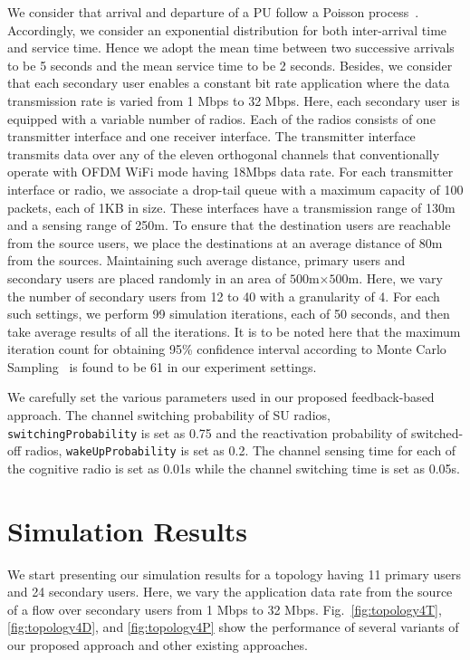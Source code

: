 We consider that arrival and departure of a PU follow a Poisson process~\cite{heo2008mathematical}. Accordingly, we consider an exponential distribution for both inter-arrival time and service time. Hence we adopt the mean time between two successive arrivals to be 5 seconds and the mean service time to be 2 seconds. Besides, we consider that each secondary user enables a constant bit rate application where the data transmission rate is varied from 1 Mbps to 32 Mbps. Here, each secondary user is equipped with a variable number of radios. Each of the radios consists of one transmitter interface and one receiver interface. The transmitter interface transmits data over any of the eleven orthogonal channels that conventionally operate with OFDM WiFi mode having 18Mbps data rate. For each transmitter interface or radio, we associate a drop-tail queue with a maximum capacity of 100 packets, each of 1KB in size. These interfaces have a transmission range of 130m and a sensing range of 250m. To ensure that the destination users are reachable from the source users, we place the destinations at an average distance of 80m from the sources. Maintaining such average distance, primary users and secondary users are placed randomly in an area of $500$m$\times 500$m. Here, we vary the number of secondary users from 12 to 40 with a granularity of 4. For each such settings, we perform 99 simulation iterations, each of 50 seconds, and then take average results of all the iterations. It is to be noted here that the maximum iteration count for obtaining 95\% confidence interval according to Monte Carlo Sampling~\cite{winston2000simulation} is found to be 61 in our experiment settings. 

We carefully set the various parameters used in our proposed feedback-based approach. The channel switching probability of SU radios, \texttt{switchingProbability} is set as 0.75 and the reactivation probability of switched-off radios, \texttt{wakeUpProbability} is set as 0.2. The channel sensing time for each of the cognitive radio is set as 0.01s while the channel switching time is set as 0.05s.

\section{Simulation Results}




We start presenting our simulation results for a topology having 11 primary users and 24 secondary users. Here, we vary the application data rate from the source of a flow over secondary users from 1 Mbps to 32 Mbps. Fig.~\ref{fig:topology4T}, \ref{fig:topology4D}, and \ref{fig:topology4P} show the performance of several variants of our proposed approach and other existing approaches.

